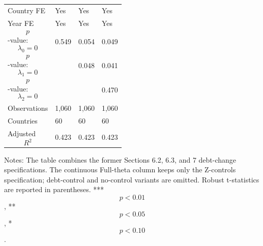 \begin{table}[H]
\begin{threeparttable}
\begin{tabularx}{\textwidth}{lYYY}
Country FE & Yes & Yes & Yes \\
Year FE & Yes & Yes & Yes \\
$$p$$-value: $$\lambda_0=0$$ & 0.549 & 0.054 & 0.049 \\
$$p$$-value: $$\lambda_1=0$$ &  & 0.048 & 0.041 \\
$$p$$-value: $$\lambda_2=0$$ &  &  & 0.470 \\
Observations & 1,060 & 1,060 & 1,060 \\
Countries & 60 & 60 & 60 \\
Adjusted $$R^2$$ & 0.423 & 0.423 & 0.423 \\
\bottomrule
\end{tabularx}
\begin{tablenotes}[flushleft]\footnotesize
\item Notes: The table combines the former Sections 6.2, 6.3, and 7 debt-change specifications. The continuous Full-theta column keeps only the Z-controls specification; debt-control and no-control variants are omitted. Robust t-statistics are reported in parentheses. *** $$p<0.01$$, ** $$p<0.05$$, * $$p<0.10$$.
\end{tablenotes}
\end{threeparttable}
\end{table}
